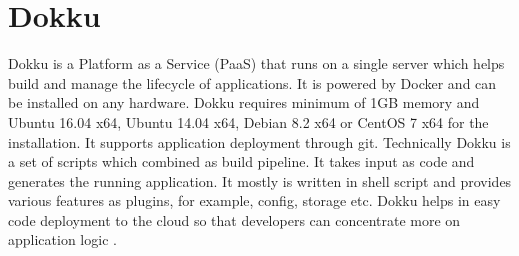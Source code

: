 \section{Dokku}
Dokku \cite{hid-sp18-402-www-dokku} is a Platform as a Service (PaaS)
that runs on a single server which helps build and manage the
lifecycle of applications. It is powered by Docker and can be
installed on any hardware. Dokku requires minimum of 1GB memory and
Ubuntu 16.04 x64, Ubuntu 14.04 x64, Debian 8.2 x64 or CentOS 7 x64 for
the installation. It supports application deployment through
git. Technically Dokku is a set of scripts which combined as build
pipeline. It takes input as code and generates the running application. It
mostly is written in shell script and provides various features as
plugins, for example, config, storage etc. Dokku helps in easy code
deployment to the cloud so that developers can concentrate more on
application logic \cite{hid-sp18-402-www-dokkuG}.
